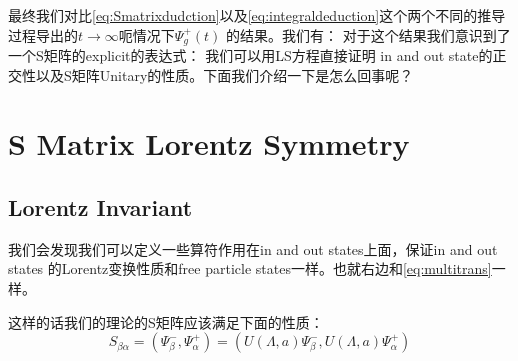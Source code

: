 最终我们对比\cref{eq:Smatrixdudction}以及\cref{eq:integraldeduction}这个两个不同的推导过程导出的$ t \to \infty $呃情况下$ \Psi_g^+(t) $  的结果。我们有：
对于这个结果我们意识到了一个S矩阵的explicit的表达式：
\line
我们可以用LS方程直接证明 in and out state的正交性以及S矩阵Unitary的性质。下面我们介绍一下是怎么回事呢？



\section{S Matrix Lorentz Symmetry}\label{sec:SMatrix Lorentz Symmetry} %

\subsection{Lorentz Invariant}

我们会发现我们可以定义一些算符作用在in and out states上面，保证in and out states 的Lorentz变换性质和free particle states一样。也就右边和\cref{eq:multitrans}一样。


这样的话我们的理论的S矩阵应该满足下面的性质：
\begin{equation}
  S_{\beta\alpha}=\left(\Psi_\beta^-,\Psi_\alpha^+\right)=\left(U(\Lambda,a)\Psi_\beta^-,U(\Lambda,a)\Psi_\alpha^+\right)
  \label{eq:Sinv}
\end{equation}

